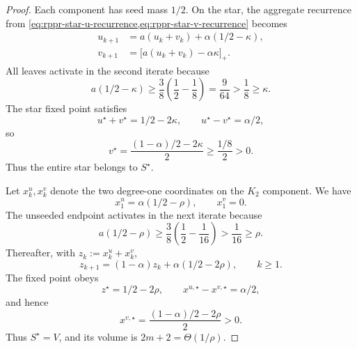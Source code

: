 \begin{proof}
Each component has seed mass \(1/2\).  On the star, the aggregate recurrence
from
\cref{eq:rppr-star-u-recurrence,eq:rppr-star-v-recurrence} becomes
\begin{align}
    u_{k+1}&=a(u_k+v_k)+\alpha(1/2-\kappa),
    \label{eq:rppr-half-star-u}\\
    v_{k+1}&=\bigl[a(u_k+v_k)-\alpha\kappa\bigr]_+.
    \label{eq:rppr-half-star-v}
\end{align}
All leaves activate in the second iterate because
\begin{equation}
    a(1/2-\kappa)
    \geq\frac38\left(\frac12-\frac18\right)
    =\frac9{64}
    >\frac18
    \geq\kappa.
    \label{eq:rppr-half-star-activation}
\end{equation}
The star fixed point satisfies
\[
    u^\star+v^\star=1/2-2\kappa,
    \qquad
    u^\star-v^\star=\alpha/2,
\]
so
\[
    v^\star
    =\frac{(1-\alpha)/2-2\kappa}{2}
    \geq\frac{1/8}{2}>0.
\]
Thus the entire star belongs to \(S^\star\).

Let \(x_k^{u},x_k^{v}\) denote the two degree-one coordinates on the
\(K_2\) component.  We have
\[
    x_1^{u}=\alpha(1/2-\rho),
    \qquad
    x_1^{v}=0.
\]
The unseeded endpoint activates in the next iterate because
\[
    a(1/2-\rho)
    \geq\frac38\left(\frac12-\frac1{16}\right)
    >\frac1{16}
    \geq\rho.
\]
Thereafter, with \(z_k:=x_k^{u}+x_k^{v}\),
\begin{equation}
    z_{k+1}
    =(1-\alpha)z_k+\alpha(1/2-2\rho),
    \qquad k\geq1.
    \label{eq:rppr-K2-sum-recurrence}
\end{equation}
The fixed point obeys
\[
    z^\star=1/2-2\rho,
    \qquad
    x^{u,\star}-x^{v,\star}=\alpha/2,
\]
and hence
\[
    x^{v,\star}
    =\frac{(1-\alpha)/2-2\rho}{2}>0.
\]
Thus \(S^\star=V\), and its volume is \(2m+2=\Theta(1/\rho)\).


\end{proof}
